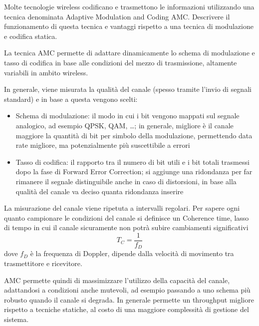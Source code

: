 \begin{questions}
    \question Molte tecnologie wireless codificano e trasmettono le informazioni utilizzando una tecnica denominata Adaptive Modulation and Coding AMC. Descrivere il funzionamento di questa tecnica e vantaggi rispetto a una tecnica di modulazione e codifica statica.
    
    \begin{solution}
        La tecnica AMC permette di adattare dinamicamente lo schema di modulazione e tasso di codifica in base alle condizioni del mezzo di trasmissione, altamente variabili in ambito wireless.
        
        In generale, viene misurata la qualità del canale (spesso tramite l'invio di segnali standard) e in base a questa vengono scelti: 
        \begin{itemize}
            \item Schema di modulazione: il modo in cui i bit vengono mappati sul segnale analogico, ad esempio QPSK, QAM, \dots; in generale, migliore è il canale maggiore la quantità di bit per simbolo della modulazione, permettendo data rate migliore, ma potenzialmente più suscettibile a errori
            
            \item Tasso di codifica: il rapporto tra il numero di bit utili e i bit totali trasmessi dopo la fase di Forward Error Correction; si aggiunge una ridondanza per far rimanere il segnale distinguibile anche in caso di distorsioni, in base alla qualità del canale va deciso quanta ridondanza inserire
        \end{itemize}
        
        La misurazione del canale viene ripetuta a intervalli regolari. Per sapere ogni quanto campionare le condizioni del canale si definisce un Coherence time, lasso di tempo in cui il canale sicuramente non potrà subire cambiamenti significativi
        $$ T_C = \frac{1}{f_D}$$
        dove $f_D$ è la frequenza di Doppler, dipende dalla velocità di movimento tra trasmettitore e ricevitore.
        
        AMC permette quindi di massimizzare l'utilizzo della capacità del canale, adattandosi a condizioni anche mutevoli, ad esempio passando a uno schema più robusto quando il canale si degrada. In generale permette un throughput migliore rispetto a tecniche statiche, al costo di una maggiore complessità di gestione del sistema.
    \end{solution}
\end{questions}